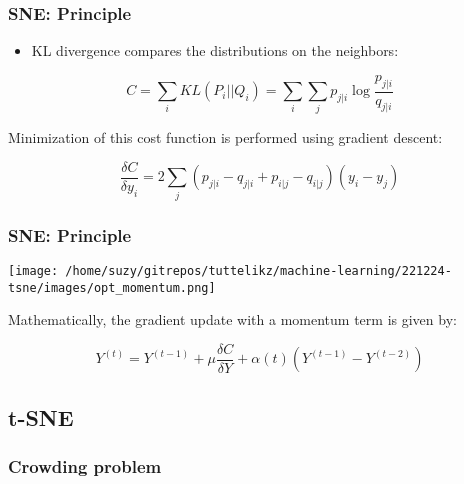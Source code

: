 \documentclass{beamer}
\begin{document}
    \begin{frame}
        \frametitle{SNE: Principle}
        \begin{itemize}
            \item KL divergence compares the distributions on the neighbors:
        \end{itemize}
        
        \begin{center}
            $$C=\sum_{i}^{} KL(P_i||Q_i) = \sum_{i}^{}\sum_{j}^{} p_{j|i}\log{\frac{p_{j|i}}{q_{j|i}}}$$
        \end{center}
        \bigskip
        Minimization of this cost function is performed using gradient descent:
        \begin{center}
            $$\frac{\delta{C}}{\delta{y_i}}=2\sum_{j}^{} (p_{j|i} - {q_{j|i}} + p_{i|j} - {q_{i|j}})(y_i-y_j)$$
        \end{center}

    \end{frame}

    \begin{frame}
        \frametitle{SNE: Principle}
        
        \begin{center}
            \texttt{[image: /home/suzy/gitrepos/tuttelikz/machine-learning/221224-tsne/images/opt\_momentum.png]}
        \end{center}
        
        Mathematically, the gradient update with a momentum term is given by:

        \begin{center}
            $$Y^{(t)}=Y^{(t-1)} + \mu\frac{\delta{C}}{\delta{Y}} + \alpha(t) \left(Y^{(t-1)} - Y^{(t-2)} \right)$$
        \end{center}

    \end{frame}

    
    \subsection{t-SNE}

    \begin{frame}
        \frametitle{Crowding problem}
    \end{frame}
\end{document}
